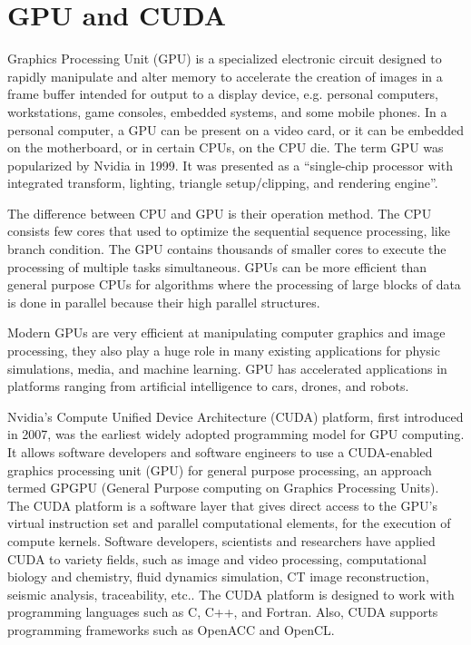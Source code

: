 \section{GPU and CUDA}
Graphics Processing Unit (GPU) is a specialized electronic circuit designed to rapidly manipulate and alter memory to accelerate the creation of images in a frame buffer intended for output to a display device, e.g. personal computers, workstations, game consoles, embedded systems, and some mobile phones. In a personal computer, a GPU can be present on a video card, or it can be embedded on the motherboard, or in certain CPUs, on the CPU die. The term GPU was popularized by Nvidia in 1999. It was presented as a ``single-chip processor with integrated transform, lighting, triangle setup/clipping, and rendering engine''.

The difference between CPU and GPU is their operation method. The CPU consists few cores that used to optimize the sequential sequence processing, like branch condition. The GPU contains thousands of smaller cores to execute the processing of multiple tasks simultaneous. GPUs can be more efficient than general purpose CPUs for algorithms where the processing of large blocks of data is done in parallel because their high parallel structures.

Modern GPUs are very efficient at manipulating computer graphics and image processing, they also play a huge role in many existing applications for physic simulations, media, and machine learning. GPU has accelerated applications in platforms ranging from artificial intelligence to cars, drones, and robots.

Nvidia's Compute Unified Device Architecture (CUDA) platform, first introduced in 2007, was the earliest widely adopted programming model for GPU computing. It allows software developers and software engineers to use a CUDA-enabled graphics processing unit (GPU) for general purpose processing, an approach termed GPGPU (General Purpose computing on Graphics Processing Units). The CUDA platform is a software layer that gives direct access to the GPU's virtual instruction set and parallel computational elements, for the execution of compute kernels. Software developers, scientists and researchers have applied CUDA to variety fields, such as image and video processing, computational biology and chemistry, fluid dynamics simulation, CT image reconstruction, seismic analysis, traceability, etc.. The CUDA platform is designed to work with programming languages such as C, C++, and Fortran. Also, CUDA supports programming frameworks such as OpenACC and OpenCL.

